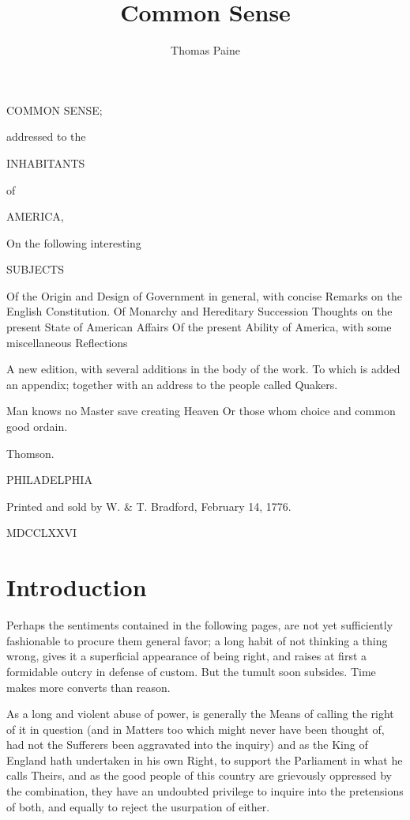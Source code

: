 \documentclass[12pt,oneside]{memoir}
\begin{document}
\title{Common Sense}
\author{Thomas Paine}
\frontmatter

COMMON SENSE;

addressed to the

INHABITANTS

of

AMERICA,

On the following interesting

SUBJECTS

    Of the Origin and Design of Government in general,
    with concise Remarks on the English Constitution.
    Of Monarchy and Hereditary Succession
    Thoughts on the present State of American Affairs
    Of the present Ability of America, with some
    miscellaneous Reflections

A new edition, with several additions in the body of the work. To
which is added an appendix; together with an address to the people
called Quakers.

Man knows no Master save creating Heaven
Or those whom choice and common good ordain.

Thomson.

PHILADELPHIA

Printed and sold by W. \& T. Bradford, February 14, 1776.

MDCCLXXVI

\newpage

\section*{Introduction}

Perhaps the sentiments contained in the following pages, are not yet sufficiently fashionable to procure them general favor; a long habit of not thinking a thing wrong, gives it a superficial appearance of being right, and raises at first a formidable outcry in defense of custom. But the tumult soon subsides. Time makes more converts than reason.

As a long and violent abuse of power, is generally the Means of calling the right of it in question (and in Matters too which might never have been thought of, had not the Sufferers been aggravated into the inquiry) and as the King of England hath undertaken in his own Right, to support the Parliament in what he calls Theirs, and as the good people of this country are grievously oppressed by the combination, they have an undoubted privilege to inquire into the pretensions of both, and equally to reject the usurpation of either.
\end{document}
